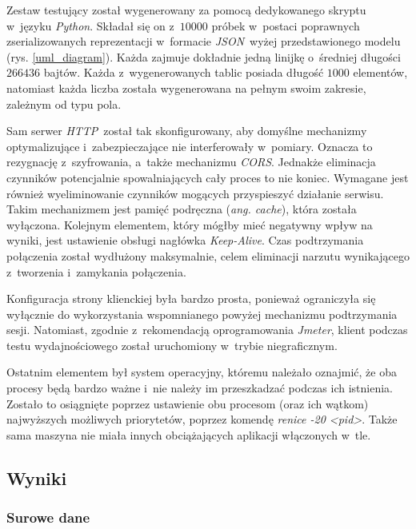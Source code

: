\documentclass[12pt]{article}
\newcommand{\n}{\newline}
\newcommand{\nonpl}[1]{{\it #1}}
\newcommand{\code}[1]{{\it #1}}
\newcommand{\ang}[1]{\nonpl{ang. #1}}
\newcommand{\JSON}{\nonpl{JSON}}
\newcommand{\HTTP}{\nonpl{HTTP}}
\newcommand{\Jmeter}{\nonpl{Jmeter}\texttrademark}
\begin{document}
{{{				Zestaw testujący został wygenerowany za pomocą dedykowanego skryptu w~języku \nonpl{Python}. Składał się on z~$10000$ próbek w~postaci poprawnych zserializowanych
				reprezentacji w~formacie \JSON~wyżej przedstawionego modelu (rys. \ref{uml_diagram}). Każda zajmuje dokładnie jedną linijkę o~średniej długości $266436$ bajtów.
				Każda z~wygenerowanych tablic posiada długość $1000$ elementów, natomiast każda liczba została wygenerowana na pełnym swoim zakresie, zależnym od typu pola.\n

				Sam serwer \HTTP~został tak skonfigurowany, aby domyślne mechanizmy optymalizujące i~zabezpieczające nie interferowały w~pomiary. Oznacza to rezygnację z~szyfrowania,
				a~także mechanizmu \nonpl{CORS}. Jednakże eliminacja czynników potencjalnie spowalniających cały proces to nie koniec. Wymagane jest również wyeliminowanie
				czynników mogących przyspieszyć działanie serwisu. Takim mechanizmem jest pamięć podręczna (\ang{cache}), która została wyłączona. Kolejnym elementem, który mógłby mieć negatywny
				wpływ na wyniki, jest ustawienie obsługi nagłówka \code{Keep-Alive}. Czas podtrzymania połączenia został wydłużony maksymalnie, celem eliminacji narzutu wynikającego
				z~tworzenia i~zamykania połączenia.\n

				Konfiguracja strony klienckiej była bardzo prosta, ponieważ ograniczyła się wyłącznie do wykorzystania wspomnianego powyżej mechanizmu podtrzymania sesji. Natomiast,
				zgodnie z~rekomendacją oprogramowania \Jmeter, klient podczas testu wydajnościowego został uruchomiony w~trybie niegraficznym.\n

				Ostatnim elementem był system operacyjny, któremu należało oznajmić, że oba procesy będą bardzo ważne i~nie należy im przeszkadzać podczas ich istnienia. Zostało to
				osiągnięte poprzez ustawienie obu procesom (oraz ich wątkom) najwyższych możliwych priorytetów, poprzez komendę \code{renice -20 <pid>}.
				Także sama maszyna nie miała innych obciążających aplikacji włączonych w~tle.
			}
		}

		{
			\subsection{Wyniki}

			{
				\subsubsection{Surowe dane}

}}}
\end{document}
